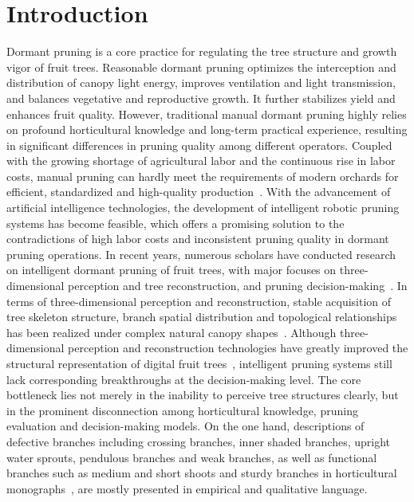 \documentclass[12pt,a4paper,fontset=fandol]{ctexart}
\begin{document}
\section{Introduction}

Dormant pruning is a core practice for regulating the tree structure and growth vigor of fruit trees.
Reasonable dormant pruning optimizes the interception and distribution of canopy light energy, improves ventilation and light transmission, and balances vegetative and reproductive growth.
It further stabilizes yield and enhances fruit quality.
However, traditional manual dormant pruning highly relies on profound horticultural knowledge and long-term practical experience, resulting in significant differences in pruning quality among different operators.
Coupled with the growing shortage of agricultural labor and the continuous rise in labor costs, manual pruning can hardly meet the requirements of modern orchards for efficient, standardized and high-quality production~\citep{chen2023dwarf}.
With the advancement of artificial intelligence technologies, the development of intelligent robotic pruning systems has become feasible, which offers a promising solution to the contradictions of high labor costs and inconsistent pruning quality in dormant pruning operations.
In recent years, numerous scholars have conducted research on intelligent dormant pruning of fruit trees, with major focuses on three-dimensional perception and tree reconstruction, and pruning decision-making~\citep{he2018review,ma2024vision}.
In terms of three-dimensional perception and reconstruction, stable acquisition of tree skeleton structure, branch spatial distribution and topological relationships has been realized under complex natural canopy shapes~\citep{raumonen2013automatic,tong2022branch}.
Although three-dimensional perception and reconstruction technologies have greatly improved the structural representation of digital fruit trees~\citep{gentilhomme2023vinet}, intelligent pruning systems still lack corresponding breakthroughs at the decision-making level.
The core bottleneck lies not merely in the inability to perceive tree structures clearly, but in the prominent disconnection among horticultural knowledge, pruning evaluation and decision-making models.
On the one hand, descriptions of defective branches including crossing branches, inner shaded branches, upright water sprouts, pendulous branches and weak branches, as well as functional branches such as medium and short shoots and sturdy branches in horticultural monographs~\citep{he2018review}, are mostly presented in empirical and qualitative language.
\end{document}
